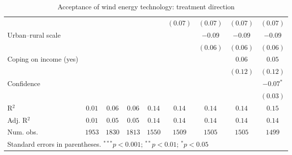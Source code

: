 \begin{table}[h]
\begin{center}
\begin{tabular}{l c c c c c c c c}
                                                                                &              &               &               &               & $(0.07)$      & $(0.07)$      & $(0.07)$      & $(0.07)$      \\
Urban–rural scale                                                               &              &               &               &               &               & $-0.09$       & $-0.09$       & $-0.09$       \\
                                                                                &              &               &               &               &               & $(0.06)$      & $(0.06)$      & $(0.06)$      \\
Coping on income (yes)                                                          &              &               &               &               &               &               & $0.06$        & $0.05$        \\
                                                                                &              &               &               &               &               &               & $(0.12)$      & $(0.12)$      \\
Confidence                                                                      &              &               &               &               &               &               &               & $-0.07^{*}$   \\
                                                                                &              &               &               &               &               &               &               & $(0.03)$      \\
\hline
R$^2$                                                                           & $0.01$       & $0.06$        & $0.06$        & $0.14$        & $0.14$        & $0.14$        & $0.14$        & $0.15$        \\
Adj. R$^2$                                                                      & $0.01$       & $0.05$        & $0.05$        & $0.14$        & $0.14$        & $0.14$        & $0.14$        & $0.14$        \\
Num. obs.                                                                       & $1953$       & $1830$        & $1813$        & $1550$        & $1509$        & $1505$        & $1505$        & $1499$        \\
\hline
\multicolumn{9}{l}{\scriptsize{Standard errors in parentheses. $^{***}p<0.001$; $^{**}p<0.01$; $^{*}p<0.05$}}
\end{tabular}
\caption{Acceptance of wind energy technology: treatment direction}
\label{table:acceptance_wind_treatment_direction}
\end{center}
\end{table}
